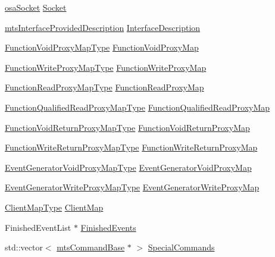 \begin{DoxyCompactItemize}
\item 
\hyperlink{classosa_socket}{osa\-Socket} \hyperlink{classmts_socket_proxy_server_a8d1606419800ffe082caf5a6805dde19}{Socket}
\item 
\hyperlink{classmts_interface_provided_description}{mts\-Interface\-Provided\-Description} \hyperlink{classmts_socket_proxy_server_a2e2a6206e203ad931a69637b8dcecd4e}{Interface\-Description}
\item 
\hyperlink{classmts_socket_proxy_server_a6d95a7cca6e51f877454df35d3fa56ab}{Function\-Void\-Proxy\-Map\-Type} \hyperlink{classmts_socket_proxy_server_a6bd22e4fe18232c34b81f2b7bf4f81c3}{Function\-Void\-Proxy\-Map}
\item 
\hyperlink{classmts_socket_proxy_server_ae84115470284d069bbd2856f4fa11e43}{Function\-Write\-Proxy\-Map\-Type} \hyperlink{classmts_socket_proxy_server_a32e552baa11f56924b5877d67a65421c}{Function\-Write\-Proxy\-Map}
\item 
\hyperlink{classmts_socket_proxy_server_ac02122bd068b3dc59511a47e2e733671}{Function\-Read\-Proxy\-Map\-Type} \hyperlink{classmts_socket_proxy_server_a8e126ba85100a6153f7e244b1cdc226f}{Function\-Read\-Proxy\-Map}
\item 
\hyperlink{classmts_socket_proxy_server_ad42c455d343f85b06a2c7047739c9c7b}{Function\-Qualified\-Read\-Proxy\-Map\-Type} \hyperlink{classmts_socket_proxy_server_ab63d24a71f84275695f79461be04b118}{Function\-Qualified\-Read\-Proxy\-Map}
\item 
\hyperlink{classmts_socket_proxy_server_a542c0cd156add7e963c92287aaf4e7f3}{Function\-Void\-Return\-Proxy\-Map\-Type} \hyperlink{classmts_socket_proxy_server_a13c785afdf7affb3f63ff3eb45560c19}{Function\-Void\-Return\-Proxy\-Map}
\item 
\hyperlink{classmts_socket_proxy_server_ab8976dbfc7fa5afbb1f02e7cddc2d71d}{Function\-Write\-Return\-Proxy\-Map\-Type} \hyperlink{classmts_socket_proxy_server_a7628f02b88924954ecbe2c242acce5ba}{Function\-Write\-Return\-Proxy\-Map}
\item 
\hyperlink{classmts_socket_proxy_server_ae784ef6005901f988064e99f28bc4dc4}{Event\-Generator\-Void\-Proxy\-Map\-Type} \hyperlink{classmts_socket_proxy_server_a4a78412a050d8cfad01e7738cc96dee4}{Event\-Generator\-Void\-Proxy\-Map}
\item 
\hyperlink{classmts_socket_proxy_server_a54071862784d4a4b6b75588e5c03df14}{Event\-Generator\-Write\-Proxy\-Map\-Type} \hyperlink{classmts_socket_proxy_server_a8e4bb429d5685a620b5d1b9894092a1d}{Event\-Generator\-Write\-Proxy\-Map}
\item 
\hyperlink{classmts_socket_proxy_server_a7119b8c41d2a72f7234f77bdcc1e2fad}{Client\-Map\-Type} \hyperlink{classmts_socket_proxy_server_acb24d470395fe5cad656863434c0ef52}{Client\-Map}
\item 
Finished\-Event\-List $\ast$ \hyperlink{classmts_socket_proxy_server_a1907551b9d6dd7bcb7e46668686d29e1}{Finished\-Events}
\item 
std\-::vector$<$ \hyperlink{classmts_command_base}{mts\-Command\-Base} $\ast$ $>$ \hyperlink{classmts_socket_proxy_server_a033ddf4256700a5393055451d6f883a0}{Special\-Commands}
\end{DoxyCompactItemize}
